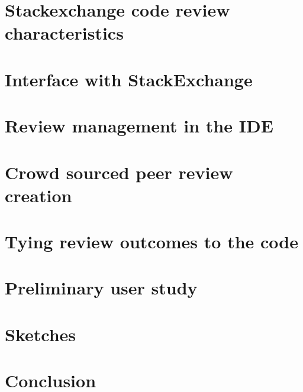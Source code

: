 \documentclass[]{sigchi}
\begin{document}
\section{Stackexchange code review characteristics}
\section{Interface with StackExchange}
\section{Review management in the IDE}
\section{Crowd sourced peer review creation}
\section{Tying review outcomes to the code}
\section{Preliminary user study}
\section{Sketches}
\section{Conclusion}
\end{document}
